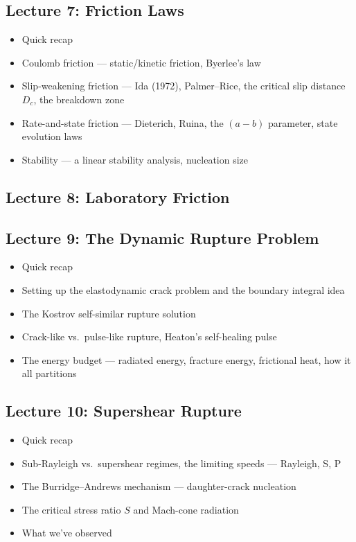 \subsection*{Lecture 7: Friction Laws}
\begin{itemize}
    \item Quick recap
    \item Coulomb friction --- static/kinetic friction, Byerlee's law
    \item Slip-weakening friction --- Ida (1972), Palmer--Rice, the critical slip distance $D_c$, the breakdown zone
    
    \item Rate-and-state friction --- Dieterich, Ruina, the $(a-b)$ parameter, state evolution laws
    \item Stability --- a linear stability analysis, nucleation size
    
\end{itemize}

\subsection*{Lecture 8: Laboratory Friction}

\subsection*{Lecture 9: The Dynamic Rupture Problem}
\begin{itemize}
    \item Quick recap
    \item Setting up the elastodynamic crack problem and the boundary integral idea
    \item The Kostrov self-similar rupture solution
    
    \item Crack-like vs.\ pulse-like rupture, Heaton's self-healing pulse
    \item The energy budget --- radiated energy, fracture energy, frictional heat, how it all partitions
    
\end{itemize}

\subsection*{Lecture 10: Supershear Rupture}
\begin{itemize}
    \item Quick recap
    \item Sub-Rayleigh vs.\ supershear regimes, the limiting speeds --- Rayleigh, S, P
    \item The Burridge--Andrews mechanism --- daughter-crack nucleation
    
    \item The critical stress ratio $S$ and Mach-cone radiation
    \item What we've observed
    
\end{itemize}

